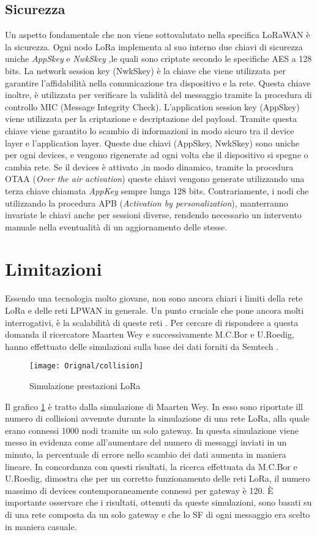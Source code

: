 \subsection{Sicurezza }
Un aspetto fondamentale che non viene sottovalutato nella specifica LoRaWAN è la
sicurezza. Ogni nodo LoRa implementa al suo interno due chiavi di sicurezza
uniche \emph{AppSkey} e \emph{NwkSkey} ,le quali sono criptate secondo le
specifiche AES a 128 bits.
La network session key (NwkSkey) è la chiave che viene utilizzata per garantire
l'affidabilità nella comunicazione tra dispositivo e la rete. Questa chiave
inoltre, è utilizzata per verificare la validità del messaggio tramite la
procedura di controllo MIC (Message Integrity Check). 
L'application session key (AppSkey) viene utilizzata per la criptazione e
decriptazione del payload. Tramite questa chiave viene garantito lo scambio di informazioni 
in modo sicuro tra il device layer e l'application layer. 
Queste due chiavi (AppSkey, NwkSkey) sono uniche per ogni devices, e vengono
rigenerate ad ogni volta che il dispositivo si spegne o cambia rete. 
Se il devices è attivato ,in modo dinamico, tramite
la procedura OTAA (\emph{Over the air activation}) queste chiavi vengono
generate utilizzando una terza chiave chiamata \emph{AppKey} sempre lunga
128 bits. Contrariamente, i nodi che utilizzando la procedura APB
(\emph{Activation by personalization}), manterranno invariate le chiavi anche per
sessioni diverse, rendendo necessario un intervento manuale nella eventualità di
un aggiornamento delle stesse.


\section{Limitazioni}
Essendo una tecnologia molto giovane, non sono ancora chiari i limiti della
rete LoRa e delle reti LPWAN in generale. 
Un punto cruciale che pone ancora molti interrogativi, è la scalabilità di
queste reti . Per cercare di rispondere a questa domanda il ricercatore Maarten Wey e
successivamente M.C.Bor e U.Roedig, hanno effettuato delle simulazioni sulla
base dei dati forniti da Semtech .
\begin{figure}[ht]
        \centering 
                \texttt{[image: Orignal/collision]}
        \caption{Simulazione prestazioni LoRa}
        \label{fig:collision}
\end{figure}
Il grafico \ref{fig:collision} è tratto dalla simulazione di Maarten
Wey. In esso sono riportate ill numero di collisioni
avvenute durante la simulazione di una rete LoRa, alla quale erano connessi 1000
nodi tramite un solo gateway. In questa simulazione viene messo in evidenza
come all'aumentare del numero di messaggi inviati in un minuto, la percentuale
di errore nello scambio dei dati aumenta in maniera lineare.
In concordanza con questi risultati, la ricerca effettuata
da M.C.Bor e U.Roedig, dimostra che  per un corretto funzionamento delle reti
LoRa, il numero massimo di devices contemporaneamente connessi per gateway è 120.
È importante osservare che i risultati,
ottenuti da queste simulazioni, sono basati su di una rete composta da un solo
gateway e che lo SF di ogni messaggio era scelto in maniera casuale. 

